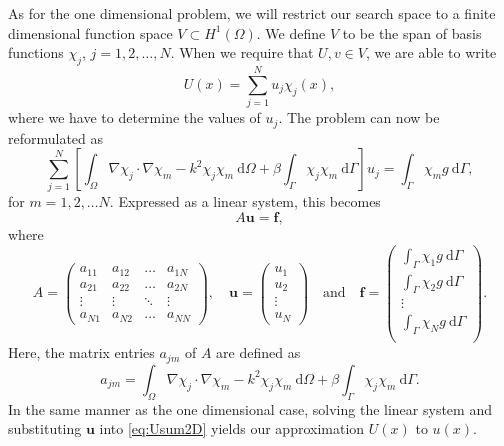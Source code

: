 \documentclass[a4paper]{article}
\newcommand{\dd}{\mathrm{d}}
\newcommand{\vct}{\mathbf}
\newcommand{\HO}{\ensuremath{H^1(\Omega)}}
\begin{document}
As for the one dimensional problem, we will restrict our search space
to a finite dimensional function space $V \subset \HO$. We define $V$
to be the span of basis functions $\chi_j$, $j = 1, 2, \ldots, N$.
When we require that $U, v \in V$, we are able to write
\begin{equation} \label{eq:Usum2D}
  U(x) = \sum^N_{j = 1} u_j \chi_j(x),
\end{equation}
where we have to determine the values of $u_j$. The problem can now be
reformulated as
\begin{equation*}
  \sum^N_{j = 1} \left[
    \int_\Omega \nabla \chi_j \cdot \nabla \chi_m
    - k^2 \chi_j \chi_m \ \dd\Omega
    + \beta \int_\Gamma \chi_j \chi_m \ \dd\Gamma
  \right] u_j
  =
  \int_\Gamma \chi_m g \ \dd\Gamma,
\end{equation*}
for $m = 1, 2, \ldots N$. Expressed as a linear system, this becomes
\begin{equation*}
  A \vct{u} = \vct{f},
\end{equation*}
where
\begin{equation*}
  A = \begin{pmatrix}
    a_{11} & a_{12} & \hdots  & a_{1N} \\
    a_{21} & a_{22} & \hdots  & a_{2N} \\
    \vdots & \vdots & \ddots  & \vdots \\
    a_{N1} & a_{N2} & \hdots  & a_{NN}
  \end{pmatrix},
\quad
\vct{u} = \begin{pmatrix}
    u_1 \\
    u_2 \\
    \vdots \\
    u_N
\end{pmatrix}
\quad \text{and} \quad
\vct{f} = \begin{pmatrix}
    \int_\Gamma \chi_1 g \ \dd\Gamma \\
    \int_\Gamma \chi_2 g \ \dd\Gamma \\
    \vdots \\
    \int_\Gamma \chi_N g \ \dd\Gamma \\
\end{pmatrix}.
\end{equation*}
Here, the matrix entries $a_{jm}$ of $A$ are defined as
\begin{equation*}
  a_{jm}
  = \int_\Omega \nabla \chi_j \cdot \nabla \chi_m
    - k^2 \chi_j \chi_m \ \dd\Omega
    + \beta \int_\Gamma \chi_j \chi_m \ \dd\Gamma.
\end{equation*}
In the same manner as the one dimensional case, solving the linear
system and substituting $\vct{u}$ into \eqref{eq:Usum2D} yields our
approximation $U(x)$ to $u(x)$.
\end{document}
